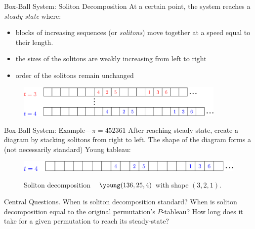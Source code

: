 \documentclass[aspectratio=169, serif]{beamer}
\begin{document}
     \begin{frame}{Box-Ball System: Soliton Decomposition}
        At a certain point, the system reaches a \emph{steady state} where:
        \begin{itemize}
            \item blocks of increasing sequences (or \emph{solitons}) move together at a speed equal to their length.
            \item the sizes of the solitons are weakly increasing from left to right
            \item order of the solitons remain unchanged
        \end{itemize}
       
        \begin{figure}
            \centering
            \includegraphics[width = 4in]{ExtraEPS.eps}
        \end{figure}
        
    \end{frame}

    \begin{frame}{Box-Ball System: Example---$\pi=452361$}
        \phantom{---}After reaching steady state, create a diagram by stacking solitons from right to left. The shape of the diagram forms a (not necessarily standard) Young tableau:\\
        \begin{figure}
            \centering
            \includegraphics[width = 5in]{Step5.eps}
        \end{figure}
        \begin{figure}
            \centering
            Soliton decomposition
            ~
            $\young(136,25,4)$  with shape $(3,2,1)$.
        \end{figure}
    \begin{block}{Central Questions.}
    When is soliton decomposition standard? When is soliton decomposition equal to the original permutation's $P$-tableau? How long does it take for a given permutation to reach its steady-state?
    \end{block}
    \end{frame}
\end{document}
